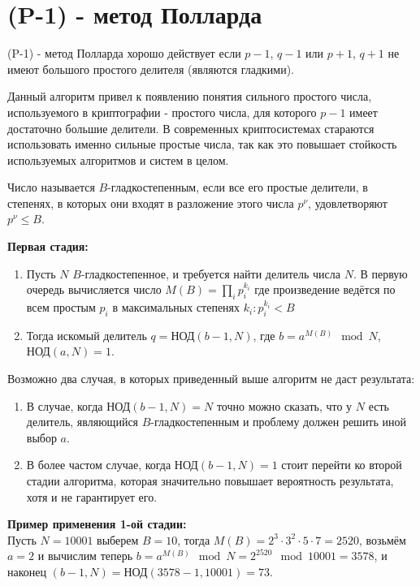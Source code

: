 \documentclass[12pt,a4paper]{scrartcl}
\begin{document}
\section{(P-1) - метод Полларда}

(P-1) - метод Полларда хорошо действует если $p-1$, $q-1$ или $p+1$, $q+1$ не имеют большого простого делителя (являются гладкими).

Данный алгоритм привел к появлению понятия сильного простого числа, используемого в криптографии - простого числа, для которого $p-1$ имеет достаточно большие делители. В современных криптосистемах стараются использовать именно сильные простые числа, так как это повышает стойкость используемых алгоритмов и систем в целом.

Число называется $B$-гладкостепенным, если все его простые делители, в степенях, в которых они входят в разложение этого числа $p^{\nu }$, удовлетворяют $p^{\nu }\leq B$. 


\textbf{Первая стадия:}

\begin{enumerate}
	\item Пусть $N$ $B$-гладкостепенное, и требуется найти делитель числа $N$. В первую очередь вычисляется число $M(B)=\prod _{i}p_{i}^{k_{i}}$ где произведение ведётся по всем простым $p_{i}$ в максимальных степенях $k_{i}:p_{i}^{k_{i}}<B$
	\item Тогда искомый делитель $q=\text{НОД}(b-1,N)$, где $b=a^{M(B)}\mod N$, $\text{НОД}(a, N) =1$.
\end{enumerate}

Возможно два случая, в которых приведенный выше алгоритм не даст результата:

\begin{enumerate}
	\item В случае, когда $\text{НОД}(b-1,N)=N$ точно можно сказать, что у $N$ есть делитель, являющийся $B$-гладкостепенным и проблему должен решить иной выбор $a$.
	\item В более частом случае, когда $\text{НОД}(b-1,N)=1$ стоит перейти ко второй стадии алгоритма, которая значительно повышает вероятность результата, хотя и не гарантирует его.\\
\end{enumerate}


\textbf{Пример применения 1-ой стадии:}\\

Пусть $N = 10001$ выберем $B = 10$, тогда $M(B)=2^{3}\cdot 3^{2}\cdot 5\cdot 7=2520$, возьмём $a=2$ и вычислим теперь $b=a^{M(B)}\mod N=2^{2520}\mod 10001=3578$, и наконец $(b-1,N)=\text{НОД}(3578-1,10001)=73$.\\
\end{document}
